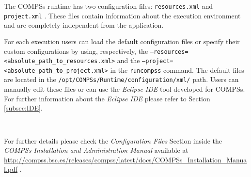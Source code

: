 The COMPSs runtime has two configuration files: \texttt{resources.xml} and \texttt{project.xml} . 
These files contain information about the execution environment and are completely independent from the application.

For each execution users can load the default configuration files or specify their custom configurations 
by using, respectively, the \texttt{--resources=<absolute\_path\_to\_resources.xml>} and the
\texttt{--project=<absolute\_path\_to\_project.xml>} in the \texttt{runcompss} command. The default files are located 
in the \texttt{/opt/COMPSs/Runtime/configuration/xml/} path. 
Users can manually edit these files or can use the \textit{Eclipse IDE} tool developed for COMPSs. For further 
information about the \textit{Eclipse IDE} please refer to Section \ref{subsec:IDE}. 

~\newline

For further details please check the \textit{Configuration Files} Section inside the \textit{COMPSs Installation and Administration Manual}
available at \url{http://compss.bsc.es/releases/compss/latest/docs/COMPSs_Installation_Manual.pdf} .

